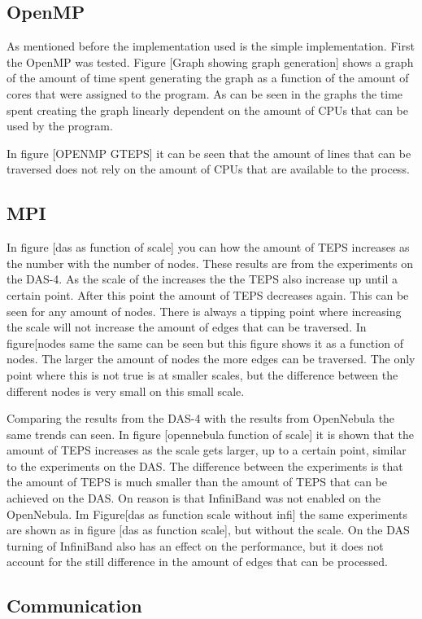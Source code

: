 \subsection{OpenMP}
As mentioned before the implementation used is the simple implementation. First the OpenMP was tested. Figure [Graph showing graph generation] shows a graph of the amount of time spent generating the graph as a function of the amount of cores that were assigned to the program. As can be seen in the graphs the time spent creating the graph linearly dependent on the amount of CPUs that can be used by the program. 

In figure [OPENMP GTEPS] it can be seen that the amount of lines that can be traversed does not rely on the amount of CPUs that are available to the process.

\subsection{MPI}
In figure [das as function of scale] you can how the amount of TEPS increases as the number with the number of nodes. These results are from the experiments on the DAS-4. As the scale of the increases the the TEPS also increase up until a certain point. After this point the amount of TEPS decreases again. This can be seen for any  amount of nodes. There is always a tipping point where increasing the scale will not increase the amount of edges that can be traversed. In figure[nodes same the same can be seen but this figure shows it as a function of nodes. The larger the amount of nodes the more edges can be traversed. The only point where this is not true is at smaller scales, but the difference between the different nodes is very small on this small scale.

Comparing the results from the DAS-4 with the results from OpenNebula the same trends can seen. In figure [opennebula function of scale] it is shown that the amount of TEPS increases as the scale gets larger, up to a certain point, similar to the experiments on the DAS. The difference between the experiments is that the amount of TEPS is much smaller than the amount of TEPS that can be achieved on the DAS. On reason is that InfiniBand was not enabled on the OpenNebula. Im Figure[das as function scale without infi] the same experiments are shown as in  figure [das as function scale], but without the scale. On the DAS turning of  InfiniBand also has an effect on the performance, but it does not account for the still difference in the amount of edges that can be processed.

\subsection{Communication}

